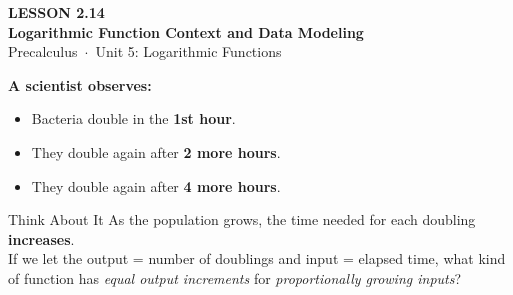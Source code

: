 \documentclass[aspectratio=169, 11pt]{beamer}
\begin{document}
{
\begin{frame}[plain]
  \vspace{2.8cm}\hspace{0.55cm}%
  \begin{minipage}{0.9\textwidth}
    {\color{goldacc}\bfseries\small LESSON 2.14}\\[0.5cm]
    {\color{white}\bfseries\LARGE Logarithmic Function Context and Data Modeling}\\[1.2cm]
    {\color{skymid}\small Precalculus~$\cdot$~Unit 5: Logarithmic Functions}
  \end{minipage}
\end{frame}
}

\begin{frame}[t, plain]

  \vspace{0.3cm}
  \textbf{A scientist observes:}
  \begin{itemize}
    \setlength{\itemsep}{8pt}
    \item Bacteria double in the \textbf{1st hour}.
    \item They double again after \textbf{2 more hours}.
    \item They double again after \textbf{4 more hours}.
  \end{itemize}

  \vspace{0.4cm}
  \begin{block}{Think About It}
    As the population grows, the time needed for each doubling \textbf{increases}.\\[6pt]
    If we let the output = number of doublings and input = elapsed time, what kind
    of function has \emph{equal output increments} for \emph{proportionally growing inputs}?
  \end{block}
\end{frame}
\end{document}
